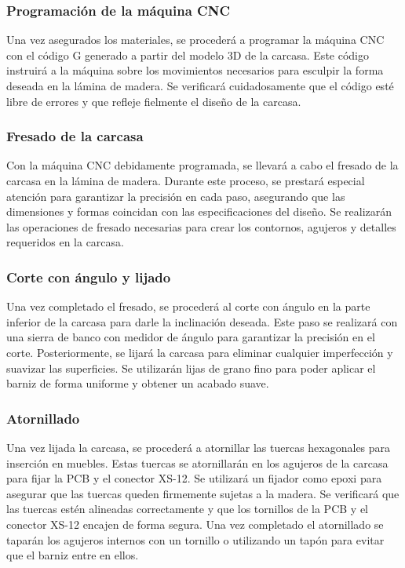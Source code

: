 \subsubsection{Programación de la máquina CNC}
Una vez asegurados los materiales, se procederá a programar la máquina CNC con el código G generado a partir del modelo 3D de la carcasa. Este código instruirá a la máquina sobre los movimientos necesarios para esculpir la forma deseada en la lámina de madera. Se verificará cuidadosamente que el código esté libre de errores y que refleje fielmente el diseño de la carcasa.

\subsubsection{Fresado de la carcasa}
Con la máquina CNC debidamente programada, se llevará a cabo el fresado de la carcasa en la lámina de madera. Durante este proceso, se prestará especial atención para garantizar la precisión en cada paso, asegurando que las dimensiones y formas coincidan con las especificaciones del diseño. Se realizarán las operaciones de fresado necesarias para crear los contornos, agujeros y detalles requeridos en la carcasa.

\subsubsection{Corte con ángulo y lijado}
Una vez completado el fresado, se procederá al corte con ángulo en la parte inferior de la carcasa para darle la inclinación deseada. Este paso se realizará con una sierra de banco con medidor de ángulo para garantizar la precisión en el corte. Posteriormente, se lijará la carcasa para eliminar cualquier imperfección y suavizar las superficies. Se utilizarán lijas de grano fino para poder aplicar el barniz de forma uniforme y obtener un acabado suave.

\subsubsection{Atornillado}
Una vez lijada la carcasa, se procederá a atornillar las tuercas hexagonales para inserción en muebles. Estas tuercas se atornillarán en los agujeros de la carcasa para fijar la PCB y el conector XS-12. Se utilizará un fijador como epoxi para asegurar que las tuercas queden firmemente sujetas a la madera. Se verificará que las tuercas estén alineadas correctamente y que los tornillos de la PCB y el conector XS-12 encajen de forma segura. Una vez completado el atornillado se taparán los agujeros internos con un tornillo o utilizando un tapón para evitar que el barniz entre en ellos.

